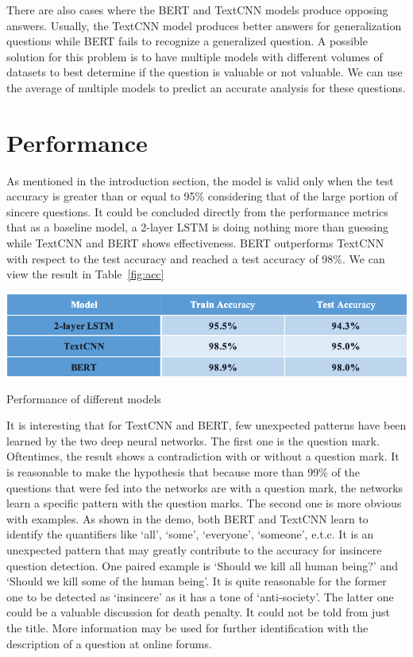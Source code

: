 \documentclass{article}
\begin{document}
There are also cases where the BERT and TextCNN models produce opposing answers. Usually, the TextCNN model produces better answers for generalization questions while BERT fails to recognize a generalized question. A possible solution for this problem is to have multiple models with different volumes of datasets to best determine if the question is valuable or not valuable. We can use the average of multiple models to predict an accurate analysis for these questions.

\section{Performance}
As mentioned in the introduction section, the model is valid only when the test accuracy is greater than or equal to 95\% considering that of the large portion of sincere questions. It could be concluded directly from the performance metrics that as a baseline model, a 2-layer LSTM is doing nothing more than guessing while TextCNN and BERT shows effectiveness. BERT outperforms TextCNN with respect to the test accuracy and reached a test accuracy of 98\%. We can view the result in Table~\ref{fig:acc}

\begin{table}[h!]
	\centering
	\includegraphics[scale=0.8]{acc.png}
	\caption{Performance of different models}
	\label{fig:acc}
\end{table}

It is interesting that for TextCNN and BERT, few unexpected patterns have been learned by the two deep neural networks. The first one is the question mark. Oftentimes, the result shows a contradiction with or without a question mark. It is reasonable to make the hypothesis that because more than 99\% of the questions that were fed into the networks are with a question mark, the networks learn a specific pattern with the question marks. The second one is more obvious with examples. As shown in the demo, both BERT and TextCNN learn to identify the quantifiers like ‘all’, ‘some’, ‘everyone’, ‘someone’, e.t.c. It is an unexpected pattern that may greatly contribute to the accuracy for insincere question detection. One paired example is ‘Should we kill all human being?’ and ‘Should we kill some of the human being’. It is quite reasonable for the former one to be detected as ‘insincere’ as it has a tone of ‘anti-society’. The latter one could be a valuable discussion for death penalty. It could not be told from just the title. More information may be used for further identification with the description of a question at online forums.
\end{document}

